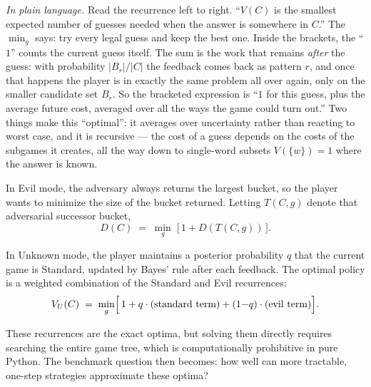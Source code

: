 \documentclass[11pt]{article}
\newcommand{\evilT}{T}
\begin{document}
\textit{In plain language.} Read the recurrence left to right. ``$V(C)$
is the smallest expected number of guesses needed when the answer is
somewhere in $C$.'' The $\min_g$ says: try every legal guess and keep
the best one. Inside the brackets, the ``$1$'' counts the current guess
itself. The sum is the work that remains \emph{after} the guess: with
probability $|B_r|/|C|$ the feedback comes back as pattern $r$, and
once that happens the player is in exactly the same problem all over
again, only on the smaller candidate set $B_r$. So the bracketed
expression is ``$1$ for this guess, plus the average future cost,
averaged over all the ways the game could turn out.'' Two things make
this ``optimal'': it averages over uncertainty rather than reacting to
worst case, and it is recursive --- the cost of a guess depends on the
costs of the subgames it creates, all the way down to single-word
subsets $V(\{w\}) = 1$ where the answer is known.

In Evil mode, the adversary always returns the largest bucket, so the
player wants to minimize the size of the bucket returned. Letting
$\evilT(C, g)$ denote that adversarial successor bucket,
\begin{equation}
  D(C) \;=\; \min_{g}\;\bigl[\,1 + D(\evilT(C, g))\,\bigr].
  \label{eq:DC}
\end{equation}

In Unknown mode, the player maintains a posterior probability $q$ that
the current game is Standard, updated by Bayes' rule after each
feedback. The optimal policy is a weighted combination of the Standard
and Evil recurrences:
\begin{equation}
  V_U(C) \;=\; \min_{g}\Bigl[\,1 + q\cdot(\text{standard term})
                              + (1{-}q)\cdot(\text{evil term})\Bigr].
  \label{eq:VU}
\end{equation}

These recurrences are the exact optima, but solving them directly
requires searching the entire game tree, which is computationally
prohibitive in pure Python. The benchmark question then becomes: how
well can more tractable, one-step strategies approximate these optima?
\end{document}
